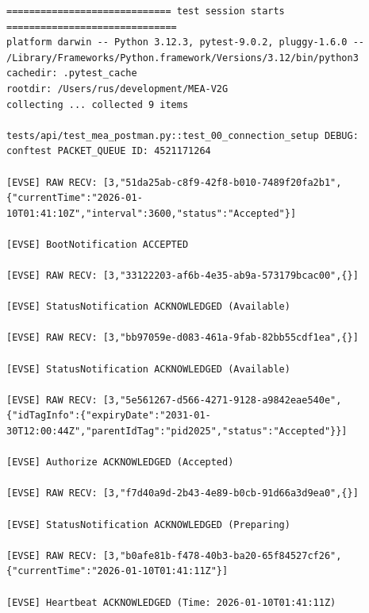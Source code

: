 \documentclass{article}
\begin{document}
\begin{lstlisting}
============================= test session starts ==============================
platform darwin -- Python 3.12.3, pytest-9.0.2, pluggy-1.6.0 -- /Library/Frameworks/Python.framework/Versions/3.12/bin/python3
cachedir: .pytest_cache
rootdir: /Users/rus/development/MEA-V2G
collecting ... collected 9 items

tests/api/test_mea_postman.py::test_00_connection_setup DEBUG: conftest PACKET_QUEUE ID: 4521171264

[EVSE] RAW RECV: [3,"51da25ab-c8f9-42f8-b010-7489f20fa2b1",{"currentTime":"2026-01-10T01:41:10Z","interval":3600,"status":"Accepted"}]

[EVSE] BootNotification ACCEPTED

[EVSE] RAW RECV: [3,"33122203-af6b-4e35-ab9a-573179bcac00",{}]

[EVSE] StatusNotification ACKNOWLEDGED (Available)

[EVSE] RAW RECV: [3,"bb97059e-d083-461a-9fab-82bb55cdf1ea",{}]

[EVSE] StatusNotification ACKNOWLEDGED (Available)

[EVSE] RAW RECV: [3,"5e561267-d566-4271-9128-a9842eae540e",{"idTagInfo":{"expiryDate":"2031-01-30T12:00:44Z","parentIdTag":"pid2025","status":"Accepted"}}]

[EVSE] Authorize ACKNOWLEDGED (Accepted)

[EVSE] RAW RECV: [3,"f7d40a9d-2b43-4e89-b0cb-91d66a3d9ea0",{}]

[EVSE] StatusNotification ACKNOWLEDGED (Preparing)

[EVSE] RAW RECV: [3,"b0afe81b-f478-40b3-ba20-65f84527cf26",{"currentTime":"2026-01-10T01:41:11Z"}]

[EVSE] Heartbeat ACKNOWLEDGED (Time: 2026-01-10T01:41:11Z)


\end{lstlisting}
\end{document}
